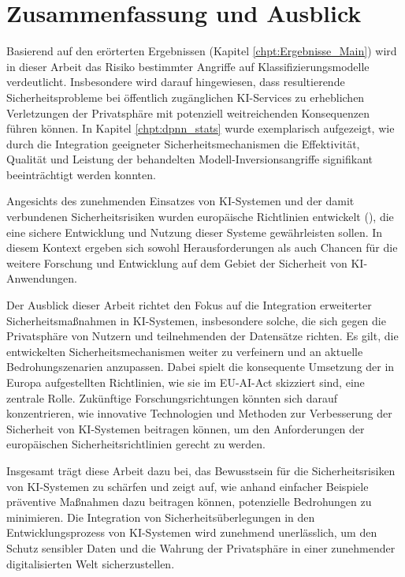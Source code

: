 \chapter{Zusammenfassung und Ausblick} \label{chpt:Zusammenfassung_und_Ausblick_Main}
Basierend auf den erörterten Ergebnissen (Kapitel \ref{chpt:Ergebnisse_Main}) wird in dieser Arbeit das Risiko bestimmter Angriffe auf Klassifizierungsmodelle verdeutlicht. Insbesondere wird darauf hingewiesen, dass resultierende Sicherheitsprobleme bei öffentlich zugänglichen KI-Services zu erheblichen Verletzungen der Privatsphäre mit potenziell weitreichenden Konsequenzen führen können. In Kapitel \ref{chpt:dpnn_stats} wurde exemplarisch aufgezeigt, wie durch die Integration geeigneter Sicherheitsmechanismen die Effektivität, Qualität und Leistung der behandelten Modell-Inversionsangriffe signifikant beeinträchtigt werden konnten.

Angesichts des zunehmenden Einsatzes von KI-Systemen und der damit verbundenen Sicherheitsrisiken wurden europäische Richtlinien entwickelt (\cite{noauthor_gesetz_2021}), die eine sichere Entwicklung und Nutzung dieser Systeme gewährleisten sollen. In diesem Kontext ergeben sich sowohl Herausforderungen als auch Chancen für die weitere Forschung und Entwicklung auf dem Gebiet der Sicherheit von KI-Anwendungen.

Der Ausblick dieser Arbeit richtet den Fokus auf die Integration erweiterter Sicherheitsmaßnahmen in KI-Systemen, insbesondere solche, die sich gegen die Privatsphäre von Nutzern und teilnehmenden der Datensätze richten. Es gilt, die entwickelten Sicherheitsmechanismen weiter zu verfeinern und an aktuelle Bedrohungszenarien anzupassen. Dabei spielt die konsequente Umsetzung der in Europa aufgestellten Richtlinien, wie sie im EU-AI-Act skizziert sind, eine zentrale Rolle. Zukünftige Forschungsrichtungen könnten sich darauf konzentrieren, wie innovative Technologien und Methoden zur Verbesserung der Sicherheit von KI-Systemen beitragen können, um den Anforderungen der europäischen Sicherheitsrichtlinien gerecht zu werden.

Insgesamt trägt diese Arbeit dazu bei, das Bewusstsein für die Sicherheitsrisiken von KI-Systemen zu schärfen und zeigt auf, wie anhand \glqq einfacher Beispiele\grqq{} präventive Maßnahmen dazu beitragen können, potenzielle Bedrohungen zu minimieren. Die Integration von Sicherheitsüberlegungen in den Entwicklungsprozess von KI-Systemen wird zunehmend unerlässlich, um den Schutz sensibler Daten und die Wahrung der Privatsphäre in einer zunehmender digitalisierten Welt sicherzustellen.
